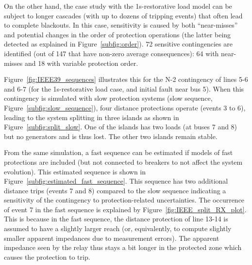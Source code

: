 On the other hand, the case study with the 1s-restorative load model can be subject to longer cascades (with up to dozens of tripping events) that often lead to complete blackouts. In this case, sensitivity is caused by both ``near-misses'' and potential changes in the order of protection operations (the latter being detected as explained in Figure~\ref{subfig:order}). 72 sensitive contingencies are identified (out of 147 that have non-zero average consequences): 64 with near-misses and 18 with variable protection order.

Figure~\ref{fig:IEEE39_sequences} illustrates this for the N-2 contingency of lines 5-6 and 6-7 (for the 1s-restorative load case, and initial fault near bus 5). When this contingency is simulated with slow protection systems (slow sequence, Figure~\ref{subfig:slow_sequence}), four distance protections operate (events 3 to 6), leading to the system splitting in three islands as shown in Figure~\ref{subfig:split_slow}. One of the islands has two loads (at buses 7 and 8) but no generators and is thus lost. The other two islands remain stable.

From the same simulation, a fast sequence can be estimated if models of fast protections are included (but not connected to breakers to not affect the system evolution). This estimated sequence is shown in Figure~\ref{subfig:estimated_fast_sequence}. This sequence has two additional distance trips (events 7 and 8) compared to the slow sequence indicating a sensitivity of the contingency to protection-related uncertainties. The occurrence of event 7 in the fast sequence is explained by Figure~\ref{fig:IEEE_split_RX_plot}. This is because in the fast sequence, the distance protection of line 13-14 is assumed to have a slightly larger reach (or, equivalently, to compute slightly smaller apparent impedances due to measurement errors). The apparent impedance seen by the relay thus stays a bit longer in the protected zone which causes the protection to trip.

